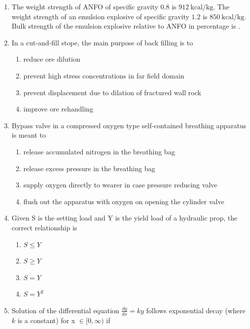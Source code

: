 \documentclass[journal,12pt,onecolumn]{IEEEtran}
\theoremstyle{remark}
\begin{document}
\begin{enumerate}
\hfill{}
\begin{multicols}{4}
\begin{enumerate}
\item $221$
\item $227$
\item $235$
\item $262$
\end{enumerate}
\end{multicols}
\item The weight strength of ANFO of specific gravity $0.8$ is $912~\text{kcal/kg}$. The weight strength of an emulsion explosive of specific gravity $1.2$ is $850~\text{kcal/kg}$. Bulk strength of the emulsion explosive relative to ANFO in percentage is \underline{\hspace{2cm}}.
\hfill{}
\item In a cut-and-fill stope, the main purpose of back filling is to
\begin{multicols}{2}
\begin{enumerate}
\item reduce ore dilution  
\item prevent high stress concentrations in far field domain  
\item prevent displacement due to dilation of fractured wall rock  
\item improve ore rehandling 
\end{enumerate}
\end{multicols}

\item Bypass valve in a compressed oxygen type self-contained breathing apparatus is meant to
\hfill{}

\begin{enumerate}
\item release accumulated nitrogen in the breathing bag
\item release excess pressure in the breathing bag
\item supply oxygen directly to wearer in case pressure reducing valve 
\item flush out the apparatus with oxygen on opening the cylinder valve 
\end{enumerate}
\item Given S is the setting load and Y is the yield load of a hydraulic prop, the correct relationship is

\hfill{}

\begin{multicols}{4}
\begin{enumerate}
\item $S \leq Y$ 
\item $S \geq Y$
\item $S = Y$
\item $S = Y^{2}$
\end{enumerate}
\end{multicols}
\item Solution of the differential equation $\frac{dy}{dx} = ky$ follows exponential decay (where $k$ is a constant) for x $\in [0, \infty)$ if


\end{enumerate}
\end{document}
